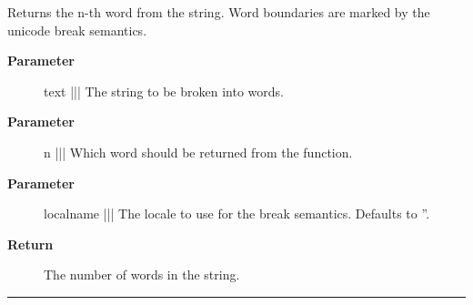 \par
Returns the n-th word from the string. Word boundaries are marked by the unicode break semantics.

\par
\begin{description}
\item [\textbf{Parameter}] text ||| The string to be broken into words.
\item [\textbf{Parameter}] n ||| Which word should be returned from the function.
\item [\textbf{Parameter}] localname ||| The locale to use for the break semantics. Defaults to ''.
\item [\textbf{Return}] The number of words in the string.
\end{description}

\rule{\textwidth}{0.4pt}


